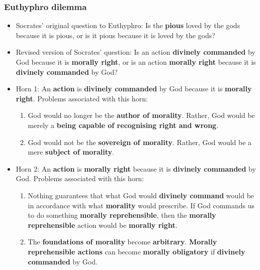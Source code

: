 \documentclass[11pt]{article}
\begin{document}
\subsubsection{Euthyphro dilemma}
\label{sec:org2967b3e}
\begin{itemize}
\item Socrates' original question to Euthyphro:
Is the \textbf{pious} loved by the gods because it is pious, or is it pious because it is loved by the gods?
\item Revised version of Socrates' question:
Is an action \textbf{divinely commanded} by God because it is \textbf{morally right}, or is an action \textbf{morally right} because it is \textbf{divinely commanded} by God?
\item Horn 1: An \textbf{action} is \textbf{divinely commanded} by God because it is \textbf{morally right}.
Problems associated with this horn:
\begin{enumerate}
\item God would no longer be the \textbf{author of morality}. Rather, God would be merely a \textbf{being capable of recognising right and wrong}.
\item God would not be the \textbf{sovereign of morality}. Rather, God would be a mere \textbf{subject of morality}.
\end{enumerate}
\item Horn 2: An \textbf{action} is \textbf{morally right} because it is \textbf{divinely commanded} by God.
Problems associated with this horn:
\begin{enumerate}
\item Nothing guarantees that what God would \textbf{divinely command} would be in accordance with what \textbf{morality} would prescribe. If God commands us to do something \textbf{morally reprehensible}, then the \textbf{morally reprehensible} action would be \textbf{morally right}.
\item The \textbf{foundations of morality} become \textbf{arbitrary}. \textbf{Morally reprehensible actions} can become \textbf{morally obligatory} if \textbf{divinely commanded} by God.
\end{enumerate}
\end{itemize}

 \newpage
\end{document}

